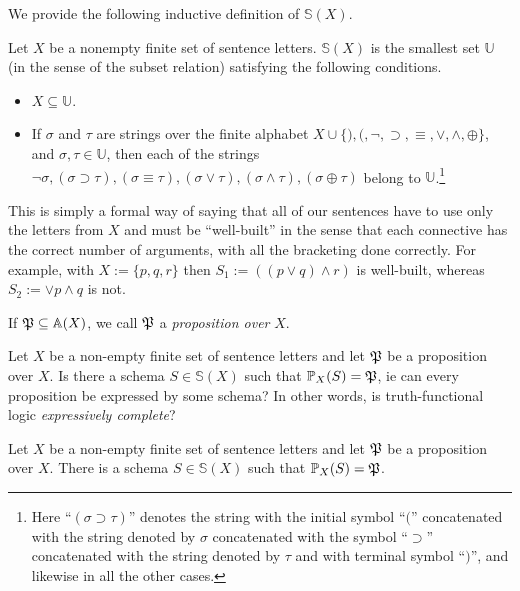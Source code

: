 We provide the following inductive definition of $\mathbb{S}(X)$. 
\begin{definition}
Let $X$ be a nonempty finite set of sentence letters. $\mathbb{S}(X)$ is the smallest set $\mathbb{U}$ (in the sense of the subset relation) satisfying the following conditions.
\begin{itemize}
\item $X\subseteq \mathbb{U}$.
\item If $\sigma$ and $\tau$ are strings over the finite alphabet $X\cup\{),(,\neg,\supset,\equiv,\vee,\wedge,\oplus\}$, and $\sigma,\tau\in\mathbb{U}$, then each of the strings $\neg\sigma, (\sigma\supset\tau),(\sigma\equiv\tau),(\sigma\vee\tau),(\sigma\wedge\tau),(\sigma\oplus\tau)$ belong to $\mathbb{U}$.\footnote{Here ``$(\sigma\supset\tau)$'' denotes the string with the initial symbol ``$($'' concatenated with the string denoted by $\sigma$ concatenated with the symbol ``$\supset$'' concatenated with the string denoted by $\tau$ and with terminal symbol ``$)$'', and likewise in all the other cases.}
\end{itemize}
\end{definition}

\begin{aside}
    This is simply a formal way of saying that all of our sentences have to use only the letters from $X$ and must be ``well-built'' in the sense that each connective has the correct number of arguments, with all the bracketing done correctly. For example, with $X := \{p, q, r\}$ then $S_1 := ((p \vee q) \land r)$ is well-built, whereas $S_2 := \vee p \land q$ is not. 
\end{aside}



If $\mfp\subseteq\mathbb{A}(X)$, we call $\mfp$ a \emph{proposition over} $X$. 

Let $X$ be a non-empty finite set of sentence letters and let $\mfp$ be a proposition over $X$. Is there a schema $S\in\mathbb{S}(X)$ such that $\prop{S}{X}=\mfp$, ie can every proposition be expressed by some schema? In other words, is truth-functional logic \emph{expressively complete}? 

\begin{theorem}\label{tflexpcomp-thm}
Let $X$ be a non-empty finite set of sentence letters and let $\mfp$ be a proposition over $X$. There is a schema $S\in\mathbb{S}(X)$ such that $\prop{S}{X}=\mfp$.
\end{theorem}

